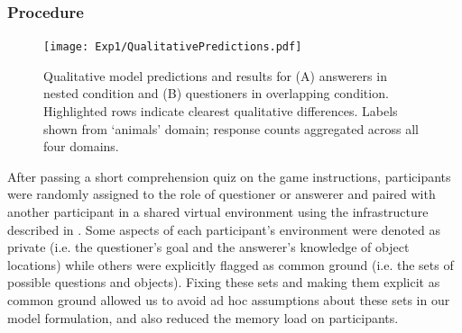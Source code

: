 \documentclass[12pt, floatsintext, jou]{apa6}
\begin{document}

\subsubsection{Procedure}

\begin{figure}[h]
\begin{center}
\texttt{[image: Exp1/QualitativePredictions.pdf]}
\end{center}
\caption{\footnotesize  Qualitative model predictions and results for (A) answerers in nested condition and (B) questioners in overlapping condition. Highlighted rows indicate clearest qualitative differences. Labels shown from `animals' domain; response counts aggregated across all four domains.}
\label{fig:exp1qualitative}
\end{figure}

After passing a short comprehension quiz on the game instructions, participants were randomly assigned to the role of questioner or answerer and paired with another participant in a shared virtual environment using the infrastructure described in . 
Some aspects of each participant's environment were denoted as private (i.e. the questioner's goal and the answerer's knowledge of object locations) while others were explicitly flagged as common ground (i.e. the sets of possible questions and objects).
Fixing these sets and making them explicit as common ground allowed us to avoid ad hoc assumptions about these sets in our model formulation, and also reduced the memory load on participants.
\end{document}
